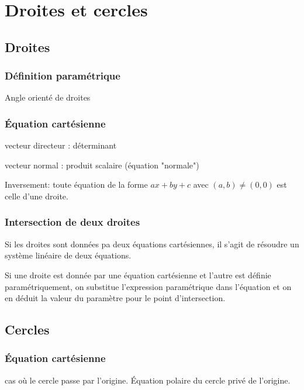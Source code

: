 \section{Droites et cercles}
\subsection{Droites}
\subsubsection{Définition paramétrique}
Angle orienté de droites
\subsubsection{\'Equation cartésienne}
vecteur directeur : déterminant 

vecteur normal : produit scalaire (équation "normale")

Inversement: toute équation de la forme $ax+by+c$ avec $(a,b)\neq (0,0)$ est celle d'une droite.
\subsubsection{Intersection de deux droites}
Si les droites sont données pa deux équations cartésiennes, il s'agit de résoudre un système linéaire de deux équations.

Si une droite est donnée par une équation cartésienne et l'autre est définie paramétriquement, on substitue l'expression paramétrique dans l'équation et on en déduit la valeur du paramètre pour le point d'intersection.
\begin{prop}
 
\end{prop}
\begin{prop}
 
\end{prop}

\begin{prop}[bissectrices]
 
\end{prop}


\subsection{Cercles}
\subsubsection{\'Equation cartésienne}
cas où le cercle passe par l'origine. \'Equation polaire du cercle privé de l'origine.
